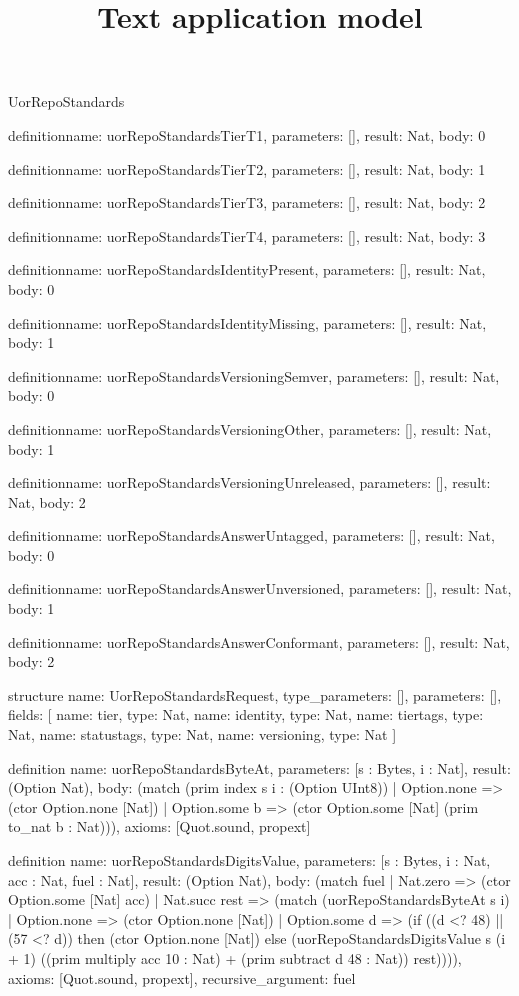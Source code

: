 \begin{lexlean}{UorRepoStandards}
\title{Text application model}
\begin{semanticmodule}
definition{name: uorRepoStandardsTierT1, parameters: [], result: Nat, body: 0}

definition{name: uorRepoStandardsTierT2, parameters: [], result: Nat, body: 1}

definition{name: uorRepoStandardsTierT3, parameters: [], result: Nat, body: 2}

definition{name: uorRepoStandardsTierT4, parameters: [], result: Nat, body: 3}

definition{name: uorRepoStandardsIdentityPresent, parameters: [], result: Nat, body: 0}

definition{name: uorRepoStandardsIdentityMissing, parameters: [], result: Nat, body: 1}

definition{name: uorRepoStandardsVersioningSemver, parameters: [], result: Nat, body: 0}

definition{name: uorRepoStandardsVersioningOther, parameters: [], result: Nat, body: 1}

definition{name: uorRepoStandardsVersioningUnreleased, parameters: [], result: Nat, body: 2}

definition{name: uorRepoStandardsAnswerUntagged, parameters: [], result: Nat, body: 0}

definition{name: uorRepoStandardsAnswerUnversioned, parameters: [], result: Nat, body: 1}

definition{name: uorRepoStandardsAnswerConformant, parameters: [], result: Nat, body: 2}

structure{
  name: UorRepoStandardsRequest,
  type_parameters: [],
  parameters: [],
  fields: [
    {name: tier, type: Nat},
    {name: identity, type: Nat},
    {name: tiertags, type: Nat},
    {name: statustags, type: Nat},
    {name: versioning, type: Nat}
  ]
}

definition{
  name: uorRepoStandardsByteAt,
  parameters: [s : Bytes, i : Nat],
  result: (Option Nat),
  body: (match (prim index s i : (Option UInt8))
    | Option.none => (ctor Option.none [Nat])
    | Option.some b => (ctor Option.some [Nat] (prim to_nat b : Nat))),
  axioms: [Quot.sound, propext]
}

definition{
  name: uorRepoStandardsDigitsValue,
  parameters: [s : Bytes, i : Nat, acc : Nat, fuel : Nat],
  result: (Option Nat),
  body: (match fuel
    | Nat.zero => (ctor Option.some [Nat] acc)
    | Nat.succ rest => (match (uorRepoStandardsByteAt s i)
      | Option.none => (ctor Option.none [Nat])
      | Option.some d => (if ((d <? 48) || (57 <? d)) then (ctor Option.none [Nat]) else (uorRepoStandardsDigitsValue s (i + 1) ((prim multiply acc 10 : Nat) + (prim subtract d 48 : Nat)) rest)))),
  axioms: [Quot.sound, propext],
  recursive_argument: fuel
}


\end{semanticmodule}
\end{lexlean}
